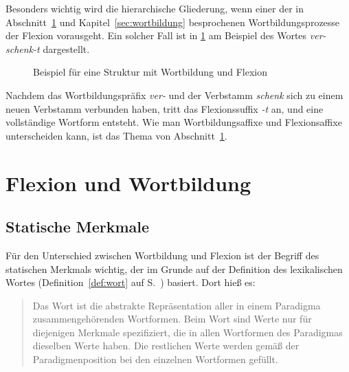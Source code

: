\enlargethispage{1\baselineskip}
Besonders wichtig wird die hierarchische Gliederung, wenn einer der in Abschnitt~\ref{sec:flexwortbild} und Kapitel~\ref{sec:wortbildung} besprochenen Wortbildungsprozesse der Flexion vorausgeht.
Ein solcher Fall ist in \ref{fig:flexwbtree} am Beispiel des Wortes \textit{ver-schenk-t} dargestellt.

\begin{figure}[!h]
  \centering
  \caption{Beispiel für eine Struktur mit Wortbildung und Flexion}
  \label{fig:flexwbtree}
\end{figure}

Nachdem das Wortbildungspräfix \textit{ver-} und der Verbstamm \textit{schenk} sich zu einem neuen Verbstamm verbunden haben, tritt das Flexionssuffix \textit{-t} an, und eine vollständige Wortform entsteht.
Wie man Wortbildungsaffixe und Flexionsaffixe unterscheiden kann, ist das Thema von Abschnitt~\ref{sec:flexwortbild}.

\section{Flexion und Wortbildung}

\label{sec:flexwortbild}

\subsection{Statische Merkmale}

\label{sec:inhmerk}

Für den Unterschied zwischen Wortbildung und Flexion ist der Begriff des statischen Merkmals wichtig, der im Grunde auf der Definition des lexikalischen Wortes (Definition~\ref{def:wort} auf S.~\pageref{def:wort}) basiert.
Dort hieß es:

\begin{quote}
  Das Wort ist die abstrakte Repräsentation aller in einem Paradigma zusammengehörenden Wortformen.
  Beim Wort sind Werte nur für diejenigen Merkmale spezifiziert, die in allen Wortformen des Paradigmas dieselben Werte haben.
  Die restlichen Werte werden gemäß der Paradigmenposition bei den einzelnen Wortformen gefüllt.
\end{quote}

